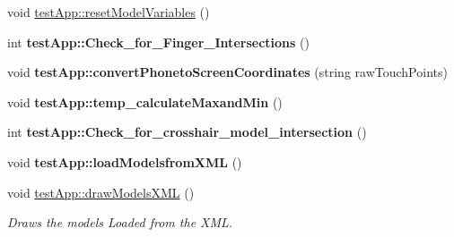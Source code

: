 \begin{DoxyCompactItemize}
\item 
void \hyperlink{group___int_variables_gac374af2c9d11d72f27d79e16f3902b95}{test\-App\-::reset\-Model\-Variables} ()
\item 
\hypertarget{group___int_variables_ga2397b9317004e36fb25ca77bb7f99d50}{int {\bfseries test\-App\-::\-Check\-\_\-for\-\_\-\-Finger\-\_\-\-Intersections} ()}\label{group___int_variables_ga2397b9317004e36fb25ca77bb7f99d50}

\item 
\hypertarget{group___int_variables_gaf4304932dc358f431608e54b243f74e5}{void {\bfseries test\-App\-::convert\-Phoneto\-Screen\-Coordinates} (string raw\-Touch\-Points)}\label{group___int_variables_gaf4304932dc358f431608e54b243f74e5}

\item 
\hypertarget{group___int_variables_gae813833c1d2e4917d75984d1828f0c30}{void {\bfseries test\-App\-::temp\-\_\-calculate\-Maxand\-Min} ()}\label{group___int_variables_gae813833c1d2e4917d75984d1828f0c30}

\item 
\hypertarget{group___int_variables_gacff4b4d2d795806c8586f83602457ed7}{int {\bfseries test\-App\-::\-Check\-\_\-for\-\_\-crosshair\-\_\-model\-\_\-intersection} ()}\label{group___int_variables_gacff4b4d2d795806c8586f83602457ed7}

\item 
\hypertarget{group___int_variables_ga307def5df81c899db2107fa85ef6a081}{void {\bfseries test\-App\-::load\-Modelsfrom\-X\-M\-L} ()}\label{group___int_variables_ga307def5df81c899db2107fa85ef6a081}

\item 
\hypertarget{group___int_variables_gaca7cf2d8efb6d7ccecadf86bb97afc2b}{void \hyperlink{group___int_variables_gaca7cf2d8efb6d7ccecadf86bb97afc2b}{test\-App\-::draw\-Models\-X\-M\-L} ()}\label{group___int_variables_gaca7cf2d8efb6d7ccecadf86bb97afc2b}

\begin{DoxyCompactList}\small\item\em Draws the models Loaded from the X\-M\-L. \end{DoxyCompactList}\end{DoxyCompactItemize}
